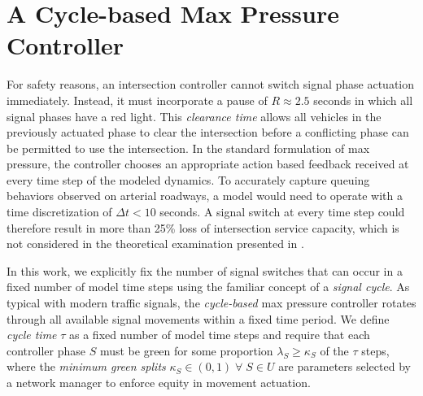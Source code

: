 \section{A Cycle-based Max Pressure Controller} 
For safety reasons, an intersection controller cannot switch signal phase actuation immediately. Instead, it must incorporate a pause of $R\approx2.5$ seconds in which all signal phases have a red light. This \emph{clearance time} allows all vehicles in the previously actuated phase to clear the intersection before a conflicting phase can be permitted to use the intersection. In the standard formulation of max pressure, the controller chooses an appropriate action based feedback received at every time step of the modeled dynamics. To accurately capture queuing behaviors observed on arterial roadways, a model would need to operate with a time discretization of $\Delta t< 10$ seconds. A signal switch at every time step could therefore result in more than 25\% loss of intersection service capacity, which is not considered in the theoretical examination presented in \cite{MaxPressureStochastic}. 

In this work, we explicitly fix the number of signal switches that can occur in a fixed number of model time steps using the familiar concept of a \emph{signal cycle}. As typical with modern traffic signals, the \emph{cycle-based} max pressure controller rotates through all available signal movements within a fixed time period. We define \emph{cycle time} $\tau$ as a fixed number of model time steps and require that each controller phase $S$ must be green for some proportion $\lambda_S \geq \kappa_S$ of the $\tau$ steps, where the \emph{minimum green splits} $\kappa_S \in (0,1) \; \forall \; S \in U $ are parameters selected by a network manager to enforce equity in movement actuation.  


